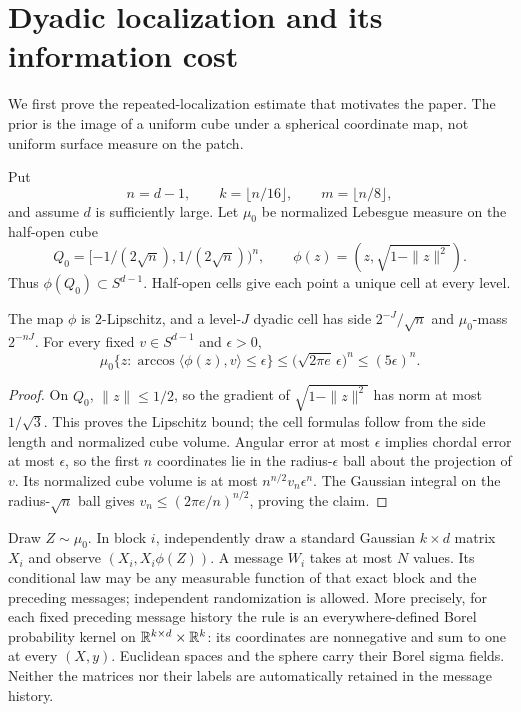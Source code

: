 \section{Dyadic localization and its information cost}\label{l:dyadic}

We first prove the repeated-localization estimate that motivates the paper. The prior is the image of a uniform cube under a spherical coordinate map, not uniform surface measure on the patch.

Put
\[
 n=d-1,\qquad k=\lfloor n/16\rfloor,\qquad
 m=\lfloor n/8\rfloor,
\]
and assume $d$ is sufficiently large. Let $\mu_0$ be normalized Lebesgue
measure on the half-open cube
\[
 Q_0=[-1/(2\sqrt n),1/(2\sqrt n))^n,
 \qquad \phi(z)=(z,\sqrt{1-\|z\|^2}).
\]
Thus $\phi(Q_0)\subset S^{d-1}$. Half-open cells give each point a
unique cell at every level.

\begin{lemma}\label{ld:cube-geometry}
The map \(\phi\) is \(2\)-Lipschitz, and a level-\(J\) dyadic cell
has side \(2^{-J}/\sqrt n\) and \(\mu_0\)-mass \(2^{-nJ}\).
For every fixed \(v\in S^{d-1}\) and \(\epsilon>0\),
\[
 \mu_0\{z:\arccos\langle\phi(z),v\rangle\le\epsilon\}
 \le \bigl(\sqrt{2\pi e}\,\epsilon\bigr)^n
 \le(5\epsilon)^n.
\]
\end{lemma}
\begin{proof}
On \(Q_0\), \(\|z\|\le1/2\), so the gradient of
\(\sqrt{1-\|z\|^2}\) has norm at most \(1/\sqrt3\).
This proves the Lipschitz bound; the cell formulas follow from the
side length and normalized cube volume. Angular error at most
\(\epsilon\) implies chordal error at most \(\epsilon\), so the first
\(n\) coordinates lie in the radius-\(\epsilon\) ball about the
projection of \(v\). Its normalized cube volume is at most
\(n^{n/2}v_n\epsilon^n\). The Gaussian integral on the radius-\(\sqrt n\)
ball gives \(v_n\le(2\pi e/n)^{n/2}\), proving the claim.
\end{proof}

Draw $Z\sim\mu_0$. In block $i$, independently draw a standard Gaussian
$k\times d$ matrix $X_i$ and observe $(X_i,X_i\phi(Z))$. A message
$W_i$ takes at most $N$ values. Its conditional law may be any measurable
function of that exact block and the preceding messages; independent
randomization is allowed. More precisely, for each fixed preceding
message history the rule is an everywhere-defined Borel probability
kernel on $\mathbb R^{k\times d}\times\mathbb R^k$: its coordinates are nonnegative
and sum to one at every $(X,y)$. Euclidean spaces and the sphere carry
their Borel sigma fields. Neither the matrices nor their labels are
automatically retained in the message history.

